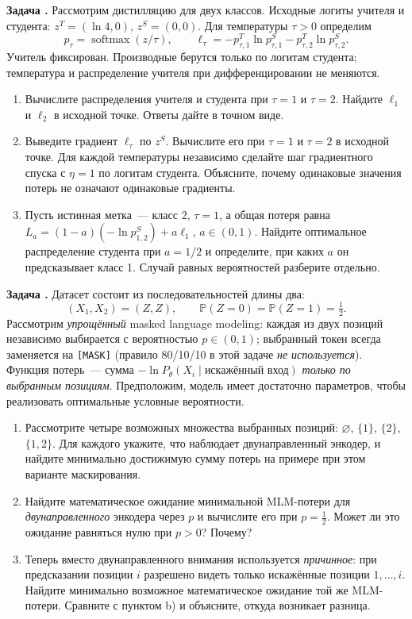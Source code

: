 \documentclass[12pt,letterpaper]{article}
\newcounter{task}
\newcommand{\task}{\par\addvspace{0.8\baselineskip}%
  \refstepcounter{task}\noindent\textbf{Задача \thetask.}\enspace}
\DeclareMathOperator{\softmax}{softmax}
\begin{document}
\task
Рассмотрим дистилляцию для двух классов. Исходные логиты учителя
и студента: $z^T=(\ln 4,0)$, $z^S=(0,0)$. Для температуры $\tau>0$
определим
\[
  p_\tau=\softmax(z/\tau),\qquad
  \ell_\tau=-p^T_{\tau,1}\ln p^S_{\tau,1}
            -p^T_{\tau,2}\ln p^S_{\tau,2}.
\]
Учитель фиксирован. Производные берутся только по логитам студента;
температура и распределение учителя при дифференцировании не меняются.
\begin{enumerate}
  \item Вычислите распределения учителя и студента при $\tau=1$
  и $\tau=2$. Найдите $\ell_1$ и $\ell_2$ в исходной точке.
  Ответы дайте в точном виде.

  \newpage

  \item Выведите градиент $\ell_\tau$ по $z^S$. Вычислите его при
  $\tau=1$ и $\tau=2$ в исходной точке. Для каждой температуры независимо
  сделайте шаг градиентного спуска с $\eta=1$ по логитам студента.
  Объясните, почему одинаковые значения потерь не означают одинаковые
  градиенты.

  \item Пусть истинная метка~--- класс 2, $\tau=1$, а общая потеря равна
  $L_a=(1-a)(-\ln p^S_{1,2})+a\ell_1$, $a\in(0,1)$.
  Найдите оптимальное распределение студента при $a=1/2$ и определите,
  при каких $a$ он предсказывает класс 1. Случай равных вероятностей
  разберите отдельно.
\end{enumerate}

\task
Датасет состоит из последовательностей длины два:
\[
  (X_1,X_2)=(Z,Z),\qquad
  \mathbb{P}(Z=0)=\mathbb{P}(Z=1)=\tfrac12.
\]
Рассмотрим \emph{упрощённый} masked language modeling: каждая из двух
позиций независимо выбирается с вероятностью $p\in(0,1)$; выбранный
токен всегда заменяется на \texttt{[MASK]} (правило 80/10/10 в этой
задаче \emph{не используется}). Функция потерь~--- сумма
$-\ln P_\theta(X_i\mid\text{искажённый вход})$ \emph{только по выбранным
позициям}. Предположим, модель имеет достаточно параметров, чтобы
реализовать оптимальные условные вероятности.
\begin{enumerate}
  \item Рассмотрите четыре возможных множества выбранных позиций:
  $\varnothing$, $\{1\}$, $\{2\}$, $\{1,2\}$. Для каждого укажите,
  что наблюдает двунаправленный энкодер, и найдите минимально достижимую
  сумму потерь на примере при этом варианте маскирования.

  \item Найдите математическое ожидание минимальной MLM-потери для
  \emph{двунаправленного} энкодера через $p$ и вычислите его при
  $p=\tfrac12$. Может ли это ожидание равняться нулю при $p>0$? Почему?

  \item Теперь вместо двунаправленного внимания используется
  \emph{причинное}: при предсказании позиции $i$ разрешено видеть только
  искажённые позиции $1,\ldots,i$. Найдите минимально возможное
  математическое ожидание той же MLM-потери. Сравните с пунктом b)
  и объясните, откуда возникает разница.
\end{enumerate}
\end{document}
